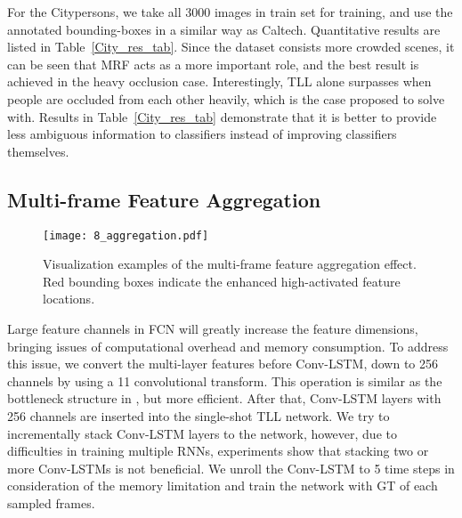 \documentclass[runningheads]{llncs}
\begin{document}
For the Citypersons, we take all 3000 images in train set for training, and use the annotated bounding-boxes in a similar way as Caltech. Quantitative results are listed in Table~\ref{City_res_tab}. Since the dataset consists more crowded scenes, it can be seen that MRF acts as a more important role, and the best result is achieved in the heavy occlusion case. Interestingly, TLL alone surpasses \cite{RLoss} when people are occluded from each other heavily, which is the case \cite{RLoss} proposed to solve with. Results in Table~\ref{City_res_tab} demonstrate that it is better to provide less ambiguous information to classifiers instead of improving classifiers themselves.
\subsection{Multi-frame Feature Aggregation}
\begin{figure}[t]
	\centering
	\texttt{[image: 8\_aggregation.pdf]}
	\caption{Visualization examples of the multi-frame feature aggregation effect. Red bounding boxes indicate the enhanced high-activated feature locations.}
	\label{fig8}
\end{figure}

Large feature channels in FCN will greatly increase the feature dimensions, bringing issues of computational overhead and memory consumption. To address this issue, we convert the multi-layer features before Conv-LSTM, down to 256 channels by using a 11 convolutional transform. This operation is similar as the bottleneck structure in \cite{VOD}, but more efficient. After that, Conv-LSTM layers with 256 channels are inserted into the single-shot TLL network. We try to incrementally stack Conv-LSTM layers to the network, however, due to difficulties in training multiple RNNs, experiments show that stacking two or more Conv-LSTMs is not beneficial. We unroll the Conv-LSTM to 5 time steps in consideration of the memory limitation and train the network with GT of each sampled frames.
\end{document}

